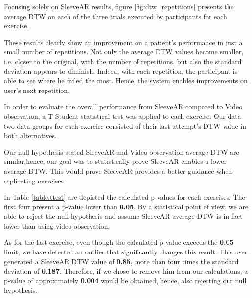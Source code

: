 Focusing solely on SleeveAR results, figure \ref{fig:dtw_repetitions} presents the average DTW on each of the three trials executed by participants for each exercise. 

These results clearly show an improvement on a patient's performance in just a small number of repetitions. 
Not only the average DTW values become smaller, i.e. closer to the original, with the number of repetitions, but also the standard deviation appears to diminish. 
Indeed, with each repetition, the participant is able to see where he failed the most. Hence,
the system enables improvements on user's next repetition.




In order to evaluate the overall performance from SleeveAR compared to Video observation, a T-Student statistical test was applied to each exercise. Our data two data groups for each exercise consisted of their last attempt's DTW value in both alternatives.

Our null hypothesis stated SleeveAR and Video observation average DTW are similar,hence, our goal was to statistically prove SleeveAR enables a lower average DTW. This would prove SleeveAR provides a better guidance when replicating exercises.

In Table \ref{table:ttest} are depicted the calculated p-values for each exercises.
The first four present a p-value lower than \textbf{0.05}. 
By a statistical point of view, we are able to reject the null hypothesis and assume SleeveAR average DTW is in fact lower than using video observation.

As for the last exercise, even though the calculated p-value exceeds the \textbf{0.05} limit, we have detected an outlier that significantly changes this result.
This user generated a SleeveAR DTW value of \textbf{0.85}, more than four times the standard deviation of \textbf{0.187}. 
Therefore, if we chose to remove him from our calculations, a p-value of approximately \textbf{0.004} would be obtained, hence, also rejecting our null hypothesis.


